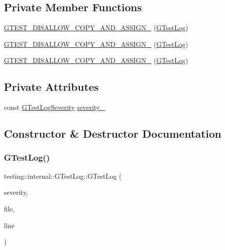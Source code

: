 \subsection*{Private Member Functions}
\begin{DoxyCompactItemize}
\item 
\mbox{\hyperlink{classtesting_1_1internal_1_1_g_test_log_ab6032a126d36a80163fdcd406fce3aad}{G\+T\+E\+S\+T\+\_\+\+D\+I\+S\+A\+L\+L\+O\+W\+\_\+\+C\+O\+P\+Y\+\_\+\+A\+N\+D\+\_\+\+A\+S\+S\+I\+G\+N\+\_\+}} (\mbox{\hyperlink{classtesting_1_1internal_1_1_g_test_log}{G\+Test\+Log}})
\item 
\mbox{\hyperlink{classtesting_1_1internal_1_1_g_test_log_ab6032a126d36a80163fdcd406fce3aad}{G\+T\+E\+S\+T\+\_\+\+D\+I\+S\+A\+L\+L\+O\+W\+\_\+\+C\+O\+P\+Y\+\_\+\+A\+N\+D\+\_\+\+A\+S\+S\+I\+G\+N\+\_\+}} (\mbox{\hyperlink{classtesting_1_1internal_1_1_g_test_log}{G\+Test\+Log}})
\item 
\mbox{\hyperlink{classtesting_1_1internal_1_1_g_test_log_ab6032a126d36a80163fdcd406fce3aad}{G\+T\+E\+S\+T\+\_\+\+D\+I\+S\+A\+L\+L\+O\+W\+\_\+\+C\+O\+P\+Y\+\_\+\+A\+N\+D\+\_\+\+A\+S\+S\+I\+G\+N\+\_\+}} (\mbox{\hyperlink{classtesting_1_1internal_1_1_g_test_log}{G\+Test\+Log}})
\end{DoxyCompactItemize}
\subsection*{Private Attributes}
\begin{DoxyCompactItemize}
\item 
const \mbox{\hyperlink{namespacetesting_1_1internal_aa6255ef3b023c5b4e1a2198d887fb977}{G\+Test\+Log\+Severity}} \mbox{\hyperlink{classtesting_1_1internal_1_1_g_test_log_ad8f75f5845900d0d2fd3cbb048a861be}{severity\+\_\+}}
\end{DoxyCompactItemize}


\subsection{Constructor \& Destructor Documentation}
\mbox{\label{classtesting_1_1internal_1_1_g_test_log_a364691bf972983a59cfa2891062a64af}} 
\subsubsection{\texorpdfstring{GTestLog()}{GTestLog()}\hspace{0.1cm}{\footnotesize\ttfamily [1/3]}}
{\footnotesize\ttfamily testing\+::internal\+::\+G\+Test\+Log\+::\+G\+Test\+Log (\begin{DoxyParamCaption}\item[{\mbox{\hyperlink{namespacetesting_1_1internal_aa6255ef3b023c5b4e1a2198d887fb977}{G\+Test\+Log\+Severity}}}]{severity,  }\item[{const char $\ast$}]{file,  }\item[{int}]{line }\end{DoxyParamCaption})}

